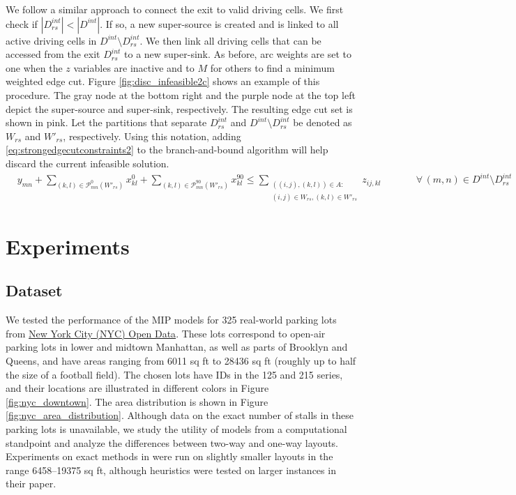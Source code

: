 \documentclass[10pt]{article}
\newcommand{\zeroparkvar}[2]{x^{0}_{#1#2}}
\newcommand{\ninetyparkvar}[2]{x^{90}_{#1#2}}
\newcommand{\drivevar}[2]{y_{#1#2}}
\newcommand{\countvar}[4]{z_{#1#2,#3#4}}
\newcommand{\gridarcset}{A}
\newcommand{\exitx}{r}
\newcommand{\exity}{s}
\newcommand{\onewaypartition}{W}
\newcommand{\onewaypartitioncomp}{W'}
\newcommand{\invzeroparksetcut}[3]{\mathcal{P}^{0}_{#1#2}(#3)}
\newcommand{\invninetyparksetcut}[3]{\mathcal{P}_{#1#2}^{90}(#3)}
\theoremstyle{definition}
\begin{document}
We follow a similar approach to connect the exit to valid driving cells. We first check if $|D^{int}_{\exitx \exity}| < |D^{int}|$. If so, a new super-source is created and is linked to all active driving cells in $D^{int} \setminus D^{int}_{\exitx \exity}$. We then link all driving cells that can be accessed from the exit $D^{int}_{\exitx \exity}$ to a new super-sink.  As before, arc weights are set to one when the $z$ variables are inactive and to $M$ for others to find a minimum weighted edge cut. Figure \ref{fig:disc_infeasible2c} shows an example of this procedure. The gray node at the bottom right and the purple node at the top left depict the super-source and super-sink, respectively. The resulting edge cut set is shown in pink. Let the partitions that separate $D^{int}_{\exitx \exity}$ and $D^{int} \setminus D^{int}_{\exitx \exity}$ be denoted as $\onewaypartition_{\exitx \exity}$ and $\onewaypartitioncomp_{\exitx \exity}$, respectively. Using this notation, adding \eqref{eq:strongedgecutconstraints2} to the branch-and-bound algorithm will help discard the current infeasible solution.
\begin{align}
     & \drivevar{m}{n} + \sum_{(k, l) \in \invzeroparksetcut{m}{n}{\onewaypartitioncomp_{\exitx \exity}}} \zeroparkvar{k}{l} + \sum_{(k, l) \in \invninetyparksetcut{m}{n}{\onewaypartitioncomp_{\exitx \exity}}} \ninetyparkvar{k}{l} \leq \sum_{\substack{((i,j),(k,l)) \in \gridarcset: \\(i,j) \in \onewaypartition_{\exitx \exity}, (k, l) \in \onewaypartitioncomp_{\exitx \exity}}} \countvar{i}{j}{k}{l} \qquad && \forall \, (m, n) \in D^{int} \setminus D^{int}_{\exitx \exity}  \label{eq:strongedgecutconstraints2}
\end{align}


\section{Experiments}
\label{sec:mipresults}

\subsection{Dataset}
We tested the performance of the MIP models for 325 real-world parking lots from \href{https://data.cityofnewyork.us/City-Government/Parking-Lot/h7zy-iq3d}{New York City (NYC) Open Data}. These lots correspond to open-air parking lots in lower and midtown Manhattan, as well as parts of Brooklyn and Queens, and have areas ranging from 6011 sq ft to 28436 sq ft (roughly up to half the size of a football field). The chosen lots have IDs in the 125 and 215 series, and their locations are illustrated in different colors in Figure \ref{fig:nyc_downtown}. The area distribution is shown in Figure \ref{fig:nyc_area_distribution}. Although data on the exact number of stalls in these parking lots is unavailable, we study the utility of models from a computational standpoint and analyze the differences between two-way and one-way layouts. Experiments on exact methods in \citep{stephan2021layout} were run on slightly smaller layouts in the range 6458--19375 sq ft, although heuristics were tested on larger instances in their paper. 
\end{document}
